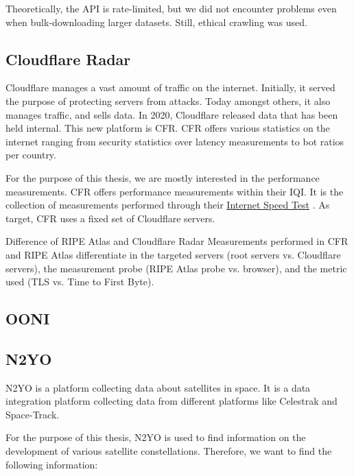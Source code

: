 Theoretically, the API is rate-limited, but we did not encounter problems even
when bulk-downloading larger datasets. Still, ethical crawling was used.

\subsection{Cloudflare Radar} \label{sec:cloudflare-radar}

Cloudflare manages a vast amount of traffic on the internet. Initially, it
served the purpose of protecting servers from attacks. Today amongst others, it
also manages traffic, and sells data. In 2020, Cloudflare released data that
has been held internal. This new platform is \ac{CFR}. \ac{CFR} offers various
statistics on the internet ranging from security statistics over latency
measurements to bot ratios per country.

For the purpose of this thesis, we are mostly interested in the performance
measurements. \ac{CFR} offers performance measurements within their \ac{IQI}.
It is the collection of measurements performed through their
\href{https://speed.cloudflare.com/}{Internet Speed Test}
\cite{DavidBelson2023, CloudflareRadarDocsIQI}. As target, \ac{CFR} uses a
fixed set of Cloudflare servers.

\begin{takeaway}{Difference of RIPE Atlas and Cloudflare Radar}
	Measurements performed in \ac{CFR} and RIPE Atlas differentiate in the
	targeted servers (root servers vs. Cloudflare servers), the measurement
	probe (RIPE Atlas probe vs. browser), and the metric used (TLS vs. Time
	to First Byte).
\end{takeaway}

\subsection{OONI} \label{sec:ooni}

\subsection{N2YO} \label{sec:n2yo}

N2YO is a platform collecting data about satellites in space. It is a data
integration platform collecting data from different platforms like Celestrak
and Space-Track.

For the purpose of this thesis, N2YO is used to find information on the
development of various satellite constellations. Therefore, we want to find the
following information:

